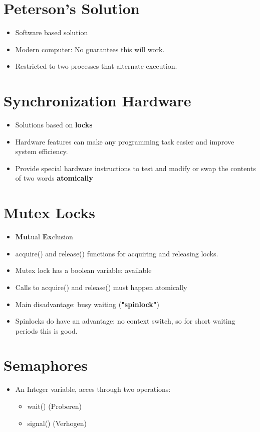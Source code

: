 \documentclass[10pt]{report}
\begin{document}
	\section{Peterson's Solution}
		\begin{itemize}
			\item Software based solution
			\item Modern computer: No guarantees this will work.
			\item Restricted to two processes that alternate execution.
		\end{itemize}

	\section{Synchronization Hardware}
		\begin{itemize}
			\item Solutions based on \textbf{locks}
			\item Hardware features can make any programming task easier and improve system efficiency.
			\item Provide special hardware instructions to test and modify or swap the contents of two words \textbf{atomically}
		\end{itemize}

	\section{Mutex Locks}
		\begin{itemize}
			\item \textbf{Mut}ual \textbf{Ex}clusion
			\item acquire() and release() functions for acquiring and releasing locks.
			\item Mutex lock has a boolean variable: available
			\item Calls to acquire() and release() must happen atomically
			\item Main disadvantage: busy waiting (\textbf{"spinlock"})
			\item Spinlocks do have an advantage: no context switch, so for short waiting periods this is good.
		\end{itemize}

	\section{Semaphores}
		\begin{itemize}
			\item An Integer variable, acces through two operations:
			\begin{itemize}
				\item wait() (Proberen)
				\item signal() (Verhogen)
			\end{itemize}
		\end{itemize}
\end{document}
